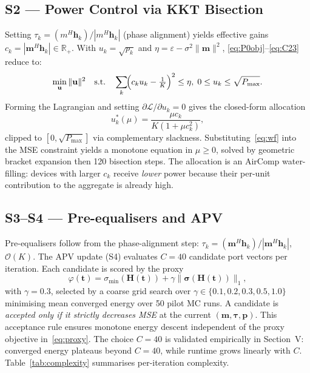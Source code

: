 \documentclass[journal,letterpaper,10pt,twocolumn]{IEEEtran}
\begin{document}
\subsection{S2 --- Power Control via KKT Bisection}

Setting $\tau_{k}\!=\!({m}^{H}\mathbf{h}_{k})/|{m}^{H}\mathbf{h}_{k}|$
(phase alignment) yields effective gains
$c_{k}\!=\!|\mathbf{m}^{H}\mathbf{h}_{k}|\!\in\!\mathbb{R}_{+}$. With
$u_{k}\!=\!\sqrt{p_{k}}$ and
$\eta\!=\!\varepsilon-\sigma^{2}\|\mathbf{m}\|^{2}$,
\eqref{eq:P0obj}--\eqref{eq:C23} reduce to:
\begin{equation}
  \min_{\mathbf{u}}\|\mathbf{u}\|^{2}\quad\text{s.t.}\quad
  \sum_{k}\!\Bigl(c_{k}u_{k}-\tfrac{1}{K}\Bigr)^{2}\leq\eta,\;
  0\leq u_{k}\leq\sqrt{P_{\max}}.
  \label{eq:power_prob}
\end{equation}
Forming the Lagrangian and setting $\partial\mathcal{L}/\partial u_{k}=0$
gives the closed-form allocation
\begin{equation}
  u_{k}^{*}(\mu) = \frac{\mu c_{k}}{K(1+\mu c_{k}^{2})},
  \label{eq:wf}
\end{equation}
clipped to $[0,\sqrt{P_{\max}}]$ via complementary slackness.
Substituting~\eqref{eq:wf} into the MSE constraint yields a monotone
equation in $\mu\geq 0$, solved by geometric bracket expansion then 120
bisection steps. The allocation is an AirComp water-filling: devices
with larger $c_{k}$ receive \textit{lower} power because their per-unit
contribution to the aggregate is already high.

\subsection{S3--S4 --- Pre-equalisers and APV}

Pre-equalisers follow from the phase-alignment step:
$\tau_{k}\!=\!(\mathbf{m}^{H}\mathbf{h}_{k})/|\mathbf{m}^{H}\mathbf{h}_{k}|$,
$\mathcal{O}(K)$. The APV update (S4) evaluates $C\!=\!40$ candidate
port vectors per iteration. Each candidate is scored by the proxy
\begin{equation}
  \varphi(\mathbf{t}) = \sigma_{\min}(\mathbf{H}(\mathbf{t}))
                       +\gamma\|\boldsymbol{\sigma}(\mathbf{H}(\mathbf{t}))\|_{1},
  \label{eq:proxy}
\end{equation}
with $\gamma\!=\!0.3$, selected by a coarse grid search over
$\gamma\!\in\!\{0.1,0.2,0.3,0.5,1.0\}$ minimising mean converged
energy over 50 pilot MC runs. A candidate is \textit{accepted only if
it strictly decreases MSE} at the current $(\mathbf{m},\boldsymbol{\tau},\mathbf{p})$.
This acceptance rule ensures monotone energy descent independent of the
proxy objective in~\eqref{eq:proxy}. The choice $C\!=\!40$ is
validated empirically in Section~V: converged energy plateaus beyond
$C\!=\!40$, while runtime grows linearly with $C$.
Table~\ref{tab:complexity} summarises per-iteration complexity.
\end{document}
